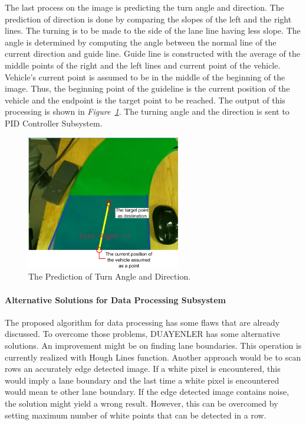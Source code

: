 \documentclass[a4paper,12pt]{article}
\begin{document}
	The last process on the image is predicting the turn angle and direction. The prediction of direction is done by comparing the slopes of the left and the right lines. The turning is to be made to the side of the lane line having less slope. The angle is determined by computing the angle between the normal line of the current direction and guide line. Guide line is constructed with the average of the middle points of the right and the left lines and current point of the vehicle. Vehicle's current point is assumed to be in the middle of the beginning of the image. Thus, the beginning point of the guideline is the current position of the vehicle and the endpoint is the target point to be reached. The output of this processing is shown in \textit{Figure~\ref{fig:turn-prediction-explained}}. The turning angle and the direction is sent to PID Controller Subsystem.
	
	\begin{figure}[H]
		\center
		\setlength{\unitlength}{\textwidth} 
		\includegraphics[width=0.6\textwidth]{images/turn-prediction-explained}
		\caption{\label{fig:turn-prediction-explained}The Prediction of Turn Angle and Direction.}
	\end{figure}
	\paragraph{Alternative Solutions for Data Processing Subsystem}
		The proposed algorithm for data processing has some flaws that are already discussed. To overcome those problems, DUAYENLER has some alternative solutions. An improvement might be on finding lane boundaries. This operation is currently realized with Hough Lines function. Another approach would be to scan rows an accurately edge detected image. If a white pixel is encountered, this would imply a lane boundary and the last time a white pixel is encountered would mean te other lane boundary. If the edge detected image contains noise, the solution might yield a wrong result. However, this can be overcomed by setting maximum number of white points that can be detected in a row.
		
\end{document}
